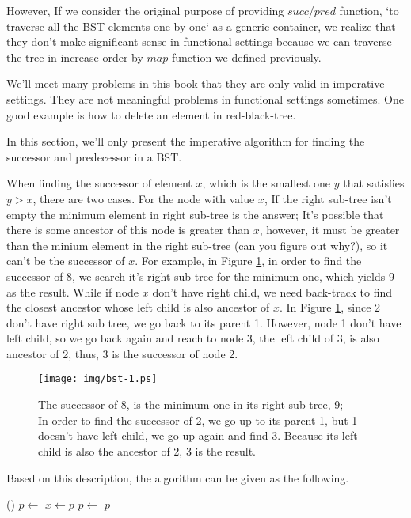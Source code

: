 \documentclass{article}
\begin{document}
However, If we consider
the original purpose of providing $succ$/$pred$ function, `to traverse all the
BST elements one by one` as a generic container, we realize
that they don't make significant sense in functional settings because
we can traverse the tree in increase order by $map$ function we defined
previously.

We'll meet many problems in this book that they are only valid
in imperative settings. They are not meaningful problems in functional
settings sometimes. One good example is how to delete an element in
red-black-tree\cite{okasaki-blog}.

In this section, we'll only present the imperative algorithm for finding
the successor and predecessor in a BST.

When finding the successor of element $x$, which is the smallest one $y$
that satisfies $y > x$, there are two cases. For the node with value $x$,
If the right sub-tree isn't empty the minimum element in right sub-tree
is the answer; It's possible that there is some ancestor of this node
is greater than $x$, however, it must be greater than the minium element
in the right sub-tree (can you figure out why?), so it can't be the successor
of $x$. For example, in Figure \ref{fig:bst-succ}, in order to find the successor
of 8, we search it's right sub tree for the minimum one, which yields 9
as the result. While if node $x$ don't have right child, we need
back-track to find the closest ancestor whose left child is also ancestor
of $x$. In Figure \ref{fig:bst-succ}, since 2 don't have right sub tree,
we go back to its parent 1. However, node 1 don't have left child, so we
go back again and reach to node 3, the left child of 3, is also ancestor
of 2, thus, 3 is the successor of node 2.

\begin{figure}[htbp]
  \centering
  \texttt{[image: img/bst-1.ps]}
  \caption{The successor of 8, is the minimum one in its right sub tree, 9; \\
           In order to find the successor of 2, we go up to its parent 1, but 1 doesn't have left child, we go up again and find 3. Because its left child is also the ancestor of 2, 3 is the result.} \label{fig:bst-succ}
\end{figure}

Based on this description, the algorithm can be given as the following.

\begin{algorithmic}[1]
    \State \Return {}()
  \Else
    \State $p \gets $ 
      \State $x \gets p$
      \State $p \gets $ 
    \EndWhile
    \State \Return $p$
  \EndIf
\EndFunction
\end{algorithmic}
\end{document}
